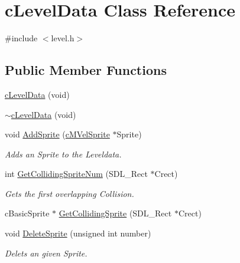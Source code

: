 \hypertarget{classc_level_data}{\section{c\-Level\-Data Class Reference}
\label{classc_level_data}
}


{\ttfamily \#include $<$level.\-h$>$}

\subsection*{Public Member Functions}
\begin{DoxyCompactItemize}
\item 
\hyperlink{classc_level_data_a195bc0671bb171a218558572cacd622e}{c\-Level\-Data} (void)
\item 
\hyperlink{classc_level_data_a5ae902555e83ea02c7ed497ccdb74d85}{$\sim$c\-Level\-Data} (void)
\item 
void \hyperlink{classc_level_data_ac868f4fdf7cf4bd9bb007426b65fc0ab}{Add\-Sprite} (\hyperlink{classc_m_vel_sprite}{c\-M\-Vel\-Sprite} $\ast$Sprite)
\begin{DoxyCompactList}\small\item\em Adds an Sprite to the Leveldata. \end{DoxyCompactList}\item 
int \hyperlink{classc_level_data_a8aa8699eafb268cb0453ffe7ba28d905}{Get\-Colliding\-Sprite\-Num} (S\-D\-L\-\_\-\-Rect $\ast$Crect)
\begin{DoxyCompactList}\small\item\em Gets the first overlapping Collision. \end{DoxyCompactList}\item 
c\-Basic\-Sprite $\ast$ \hyperlink{classc_level_data_aa395a28b4d3f5f1b21265f59f632a936}{Get\-Colliding\-Sprite} (S\-D\-L\-\_\-\-Rect $\ast$Crect)
\item 
void \hyperlink{classc_level_data_a3fddca9f09bf3d7e1fe8e12a16ed01ab}{Delete\-Sprite} (unsigned int number)
\begin{DoxyCompactList}\small\item\em Delets an given Sprite. \end{DoxyCompactList}\end{DoxyCompactItemize}
